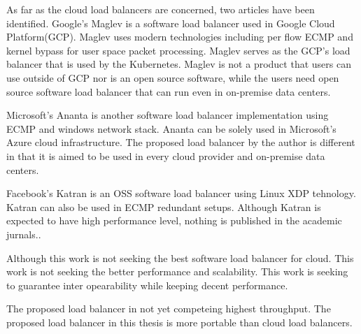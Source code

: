 As far as the cloud load balancers are concerned, two articles have been identified.
Google's Maglev \cite{eisenbud2016maglev} is a software load balancer used in Google Cloud Platform(GCP).
Maglev uses modern technologies including per flow ECMP and kernel bypass for user space packet processing.
Maglev serves as the GCP's load balancer that is used by the Kubernetes.
Maglev is not a product that users can use outside of GCP nor is an open source software, while the users need open source software load balancer that can run even in on-premise data centers.

Microsoft's Ananta \cite{patel2013ananta} is another software load balancer implementation using ECMP and windows network stack.
Ananta can be solely used in Microsoft's Azure cloud infrastructure\cite{patel2013ananta}.
The proposed load balancer by the author is different in that it is aimed to be used in every cloud provider and on-premise data centers.

Facebook's Katran \cite{2018katran} is an OSS software load balancer using Linux XDP tehnology.
Katran can also be used in ECMP redundant setups.
Although Katran is expected to have high performance level, nothing is published in the academic jurnals..

Although this work is not seeking the best software load balancer for cloud.
This work is not seeking the better performance and scalability.
This work is seeking to guarantee inter opearability while keeping decent performance.

The proposed load balancer in not yet competeing highest throughput.
The proposed load balancer in this thesis is more portable than cloud load balancers.

\begin{table}[h]
  \centering

  \par\bigskip
  \begin{minipage}{0.9\columnwidth}
    \caption[Cloud load balancer comparison]{
    Cloud load balancer comparison.
    }   
    \label{tabl:cloud_lb}
  \end{minipage}
\end{table}


